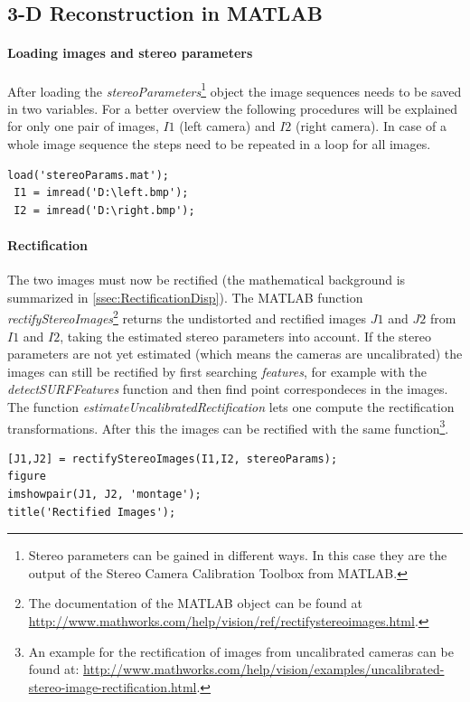 \subsection{3-D Reconstruction in MATLAB}\label{ssec:ReconstrMatlab}
\paragraph{Loading images and stereo parameters}
After loading the \textit{stereoParameters}\footnote{Stereo parameters can be gained in different ways. In this case they are the output of the Stereo Camera Calibration Toolbox from MATLAB.} object the image sequences needs to be saved in two variables.
For a better overview the following procedures will be explained for only one pair of images, $I1$ (left camera) and $I2$ (right camera). In case of a whole image sequence the steps need to be repeated in a loop for all images.
\begin{lstlisting}[caption={Load stereoParams and images.}]
 load('stereoParams.mat');
 I1 = imread('D:\left.bmp');
 I2 = imread('D:\right.bmp');
\end{lstlisting}

\paragraph{Rectification}
The two images must now be rectified (the mathematical background is summarized in \autoref{ssec:RectificationDisp}). The MATLAB function \textit{rectifyStereoImages}\footnote{The documentation of the MATLAB object can be found at \url{http://www.mathworks.com/help/vision/ref/rectifystereoimages.html}.} returns the undistorted and rectified images $J1$ and $J2$ from $I1$ and $I2$, taking the estimated stereo parameters into account. If the stereo parameters are not yet estimated (which means the cameras are uncalibrated) the images can still be rectified by first searching \textit{features}, for example with the \textit{detectSURFFeatures} function and then find point correspondeces in the images. The function \textit{estimateUncalibratedRectification} lets one compute the rectification transformations. After this the images can be rectified with the same function\footnote{An example for the rectification of images from uncalibrated cameras can be found at: \url{http://www.mathworks.com/help/vision/examples/uncalibrated-stereo-image-rectification.html}.}. 

\begin{lstlisting}[caption={Image rectification.}]
[J1,J2] = rectifyStereoImages(I1,I2, stereoParams);
figure
imshowpair(J1, J2, 'montage');
title('Rectified Images');
\end{lstlisting}

